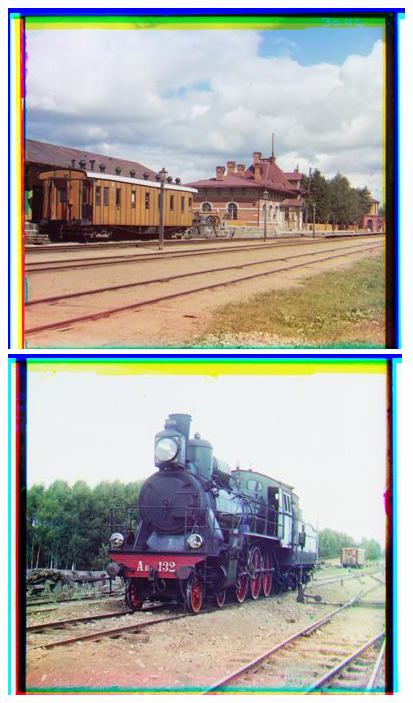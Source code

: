 \documentclass[12pt]{article}
\begin{document}
\begin{center}
\includegraphics[scale=0.6]{processed/processed-128-00398v.jpg}~
\includegraphics[scale=0.6]{processed/processed-64-00458v.jpg}
\end{center}
\end{document}
